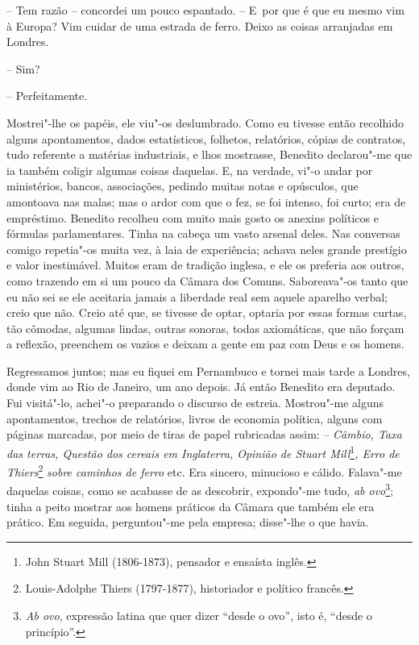 -- Tem razão -- concordei um pouco espantado. -- E~por que é que eu
mesmo vim à Europa? Vim cuidar de uma estrada de ferro. Deixo as coisas
arranjadas em Londres.

-- Sim?

-- Perfeitamente.

Mostrei"-lhe os papéis, ele viu"-os deslumbrado. Como eu tivesse então
recolhido alguns apontamentos, dados estatísticos, folhetos, relatórios,
cópias de contratos, tudo referente a matérias industriais, e lhos
mostrasse, Benedito declarou"-me que ia também coligir algumas coisas
daquelas. E, na verdade, vi"-o andar por ministérios, bancos,
associações, pedindo muitas notas e opúsculos, que amontoava nas malas;
mas o ardor com que o fez, se foi intenso, foi curto; era de empréstimo.
Benedito recolheu com muito mais gosto os anexins políticos e fórmulas
parlamentares. Tinha na cabeça um vasto arsenal deles. Nas conversas
comigo repetia"-os muita vez, à laia de experiência; achava neles grande
prestígio e valor inestimável. Muitos eram de tradição inglesa, e ele os
preferia aos outros, como trazendo em si um pouco da Câmara dos Comuns.
Saboreava"-os tanto que eu não sei se ele aceitaria jamais a liberdade
real sem aquele aparelho verbal; creio que não. Creio até que, se
tivesse de optar, optaria por essas formas curtas, tão cômodas, algumas
lindas, outras sonoras, todas axiomáticas, que não forçam a reflexão,
preenchem os vazios e deixam a gente em paz com Deus e os homens.

Regressamos juntos; mas eu fiquei em Pernambuco e tornei mais tarde a
Londres, donde vim ao Rio de Janeiro, um ano depois. Já então Benedito
era deputado. Fui visitá"-lo, achei"-o preparando o discurso de estreia.
Mostrou"-me alguns apontamentos, trechos de relatórios, livros de
economia política, alguns com páginas marcadas, por meio de tiras de
papel rubricadas assim: -- \emph{Câmbio, Taxa das terras, Questão dos
cereais em Inglaterra, Opinião de Stuart Mill}\footnote{John Stuart Mill
  (1806-1873), pensador e ensaísta inglês.}\emph{, Erro de
Thiers}\footnote{Louis-Adolphe Thiers (1797-1877), historiador e
  político francês.} \emph{sobre caminhos de ferro} etc. Era sincero,
minucioso e cálido. Falava"-me daquelas coisas, como se acabasse de as
descobrir, expondo"-me tudo, \emph{ab ovo}\footnote{\emph{Ab ovo},
  expressão latina que quer dizer ``desde o ovo'', isto é, ``desde o
  princípio''.}; tinha a peito mostrar aos homens práticos da Câmara que
também ele era prático. Em seguida, perguntou"-me pela empresa; disse"-lhe
o que havia.


